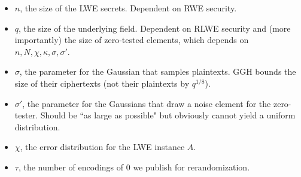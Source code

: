 \begin{itemize}
\item $n$, the size of the LWE secrets.  Dependent on RWE security.
\item $q$, the size of the underlying field.  Dependent on RLWE security and (more importantly) the size of zero-tested elements, which depends on $n, N, \chi, \kappa, \sigma, \sigma'$.
\item $\sigma$, the parameter for the Gaussian that samples plaintexts.  GGH bounds the size of their ciphertexts (not their plaintexts by $q^{1/8}$).
\item $\sigma'$, the parameter for the Gaussians that draw a noise element for the zero-tester.  Should be ``as large as possible" but obviously cannot yield a uniform distribution.
\item $\chi$, the error distribution for the LWE instance $A$.
\item $\tau$, the number of encodings of $0$ we publish for rerandomization.
\end{itemize}


